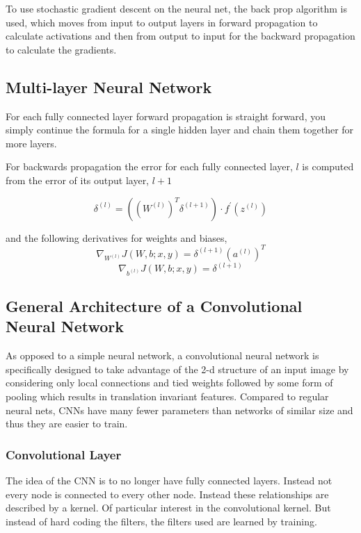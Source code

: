 \documentclass[12pt, twocolumn]{article}
\begin{document}
To use stochastic gradient descent  on the neural net, the back prop algorithm is used, which moves from input to output layers in forward propagation to calculate activations and then from output to input for the backward propagation to calculate the gradients. 


\subsection{Multi-layer Neural Network}
For each fully connected layer forward propagation is straight forward, you simply continue the formula for a single hidden layer and chain them together for more layers. 

For backwards propagation the error for each fully connected layer, $l$ is computed from the error of its output layer, $l+1$  

\begin{equation}
\delta^{(l)}=((W^{(l)})^T \delta^{(l+1)}) \cdot f ^{\prime} (z^{(l)})
\end{equation}

and the following derivatives for weights and biases, 
\begin{equation}
\nabla_{W^{(l)}}J(W,b;x,y) = \delta^{(l+1)}(a^{(l)})^T
\end{equation}
\begin{equation}
\nabla_{b^{(l)}}J(W,b;x,y)= \delta^{(l+1)}
\end{equation}



\subsection{General Architecture of a Convolutional Neural Network}
As opposed to a simple neural network, a convolutional neural network is specifically designed to take advantage of the 2-d structure of an input image by considering only local connections and tied weights followed by some form of pooling which results in translation invariant features. Compared to regular neural nets,  CNNs  have many fewer parameters than networks of similar size and thus they are easier to train. 



\subsubsection{Convolutional Layer}
The idea of the CNN is to no longer have fully connected layers. Instead not every node is connected to every other node. Instead these relationships are described by a kernel. Of particular interest in the convolutional kernel. But instead of hard coding the filters, the filters used are learned by training. 
\end{document}
